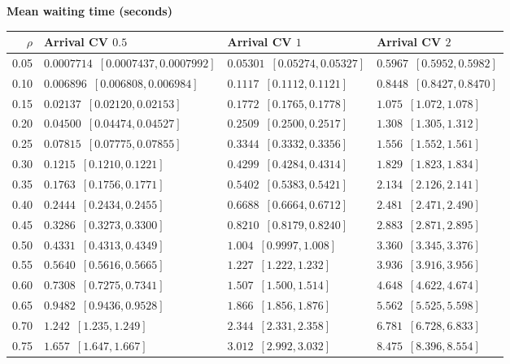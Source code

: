 \noindent\textbf{Mean waiting time (seconds)}
\par\nobreak\smallskip
{\centering\fontsize{8.1}{10.0}\selectfont
\begin{tabular*}{\linewidth}{@{\extracolsep{\fill}}rlll@{}}
\toprule
\(\rho\) & Arrival CV \(0.5\) & Arrival CV \(1\) & Arrival CV \(2\) \\
\midrule
0.05 & \(0.0007714\enspace[0.0007437,0.0007992]\) & \(0.05301\enspace[0.05274,0.05327]\) & \(0.5967\enspace[0.5952,0.5982]\) \\
0.10 & \(0.006896\enspace[0.006808,0.006984]\) & \(0.1117\enspace[0.1112,0.1121]\) & \(0.8448\enspace[0.8427,0.8470]\) \\
0.15 & \(0.02137\enspace[0.02120,0.02153]\) & \(0.1772\enspace[0.1765,0.1778]\) & \(1.075\enspace[1.072,1.078]\) \\
0.20 & \(0.04500\enspace[0.04474,0.04527]\) & \(0.2509\enspace[0.2500,0.2517]\) & \(1.308\enspace[1.305,1.312]\) \\
0.25 & \(0.07815\enspace[0.07775,0.07855]\) & \(0.3344\enspace[0.3332,0.3356]\) & \(1.556\enspace[1.552,1.561]\) \\
0.30 & \(0.1215\enspace[0.1210,0.1221]\) & \(0.4299\enspace[0.4284,0.4314]\) & \(1.829\enspace[1.823,1.834]\) \\
0.35 & \(0.1763\enspace[0.1756,0.1771]\) & \(0.5402\enspace[0.5383,0.5421]\) & \(2.134\enspace[2.126,2.141]\) \\
0.40 & \(0.2444\enspace[0.2434,0.2455]\) & \(0.6688\enspace[0.6664,0.6712]\) & \(2.481\enspace[2.471,2.490]\) \\
0.45 & \(0.3286\enspace[0.3273,0.3300]\) & \(0.8210\enspace[0.8179,0.8240]\) & \(2.883\enspace[2.871,2.895]\) \\
0.50 & \(0.4331\enspace[0.4313,0.4349]\) & \(1.004\enspace[0.9997,1.008]\) & \(3.360\enspace[3.345,3.376]\) \\
0.55 & \(0.5640\enspace[0.5616,0.5665]\) & \(1.227\enspace[1.222,1.232]\) & \(3.936\enspace[3.916,3.956]\) \\
0.60 & \(0.7308\enspace[0.7275,0.7341]\) & \(1.507\enspace[1.500,1.514]\) & \(4.648\enspace[4.622,4.674]\) \\
0.65 & \(0.9482\enspace[0.9436,0.9528]\) & \(1.866\enspace[1.856,1.876]\) & \(5.562\enspace[5.525,5.598]\) \\
0.70 & \(1.242\enspace[1.235,1.249]\) & \(2.344\enspace[2.331,2.358]\) & \(6.781\enspace[6.728,6.833]\) \\
0.75 & \(1.657\enspace[1.647,1.667]\) & \(3.012\enspace[2.992,3.032]\) & \(8.475\enspace[8.396,8.554]\) \\

\end{tabular*}}
